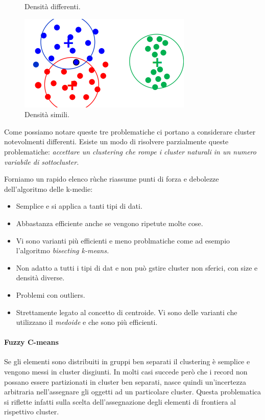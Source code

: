 \begin{itemize}
\begin{figure}[H]
\begin{minipage}[b]{0.30\textwidth}
			\caption{Densità differenti.}
		\end{minipage}
		\hfill
		\begin{minipage}[b]{0.30\textwidth}
			\centering
			\includegraphics[width=\textwidth]{clustering/pict/densita_2.png}
			\caption{Densità simili.}
		\end{minipage}
	\end{figure}
\end{itemize}
Come possiamo notare queste tre problematiche ci portano a considerare cluster notevolmenti differenti. Esiste un modo di risolvere parzialmente queste problematiche: \textit{accettare un clustering che rompe i cluster naturali in un numero variabile di sottocluster.}

Forniamo un rapido elenco rùche riassume punti di forza e debolezze dell'algoritmo delle k-medie:
\begin{itemize}
	\item Semplice e si applica a tanti tipi di dati.
	\item Abbastanza efficiente anche se vengono ripetute molte cose.
	\item Vi sono varianti più efficienti e meno problmatiche come ad esempio l'algoritmo \textit{bisecting k-means.}
	\item Non adatto a tutti i tipi di dat e non può gstire cluster non sferici, con size e densità diverse.
	\item Problemi con outliers.
	\item Strettamente legato al concetto di centroide. Vi sono delle varianti che utilizzano il \textit{medoide} e che sono più efficienti.
	
	
\end{itemize}

\paragraph{Fuzzy C-means}
Se gli elementi sono distribuiti in gruppi ben separati il clustering è semplice e vengono messi in cluster disgiunti. In molti casi succede però che i record non possano essere partizionati in cluster ben separati, nasce quindi un'incertezza arbitraria nell'assegnare gli oggetti ad un particolare cluster. Questa problematica si riflette infatti sulla scelta dell'assegnazione degli elementi di frontiera al rispettivo cluster.

